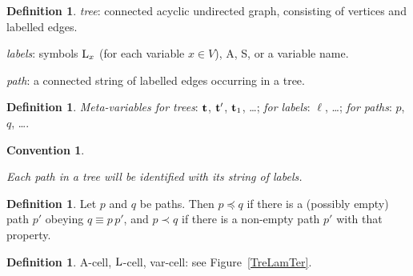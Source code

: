 \documentclass{article}
\theoremstyle{plain}
\newtheorem{Con}[The]{Convention}
\theoremstyle{definition}
\newtheorem{Def}[The]{Definition}
\begin{document}
\begin{Def}

{\em tree\/}: connected acyclic undirected graph, consisting of vertices and labelled edges.

{\em labels\/}: symbols ${\rm L}_x$ (for each variable $x \in V$), A, S, or a variable name.





{\em path\/}: a connected string of labelled edges occurring in a tree.
\end{Def}

\begin{Def}

{\em Meta-variables for trees\/}: ${\bf t}$, ${\bf t}'$, ${\bf t}_1$, \ldots;
{\em for labels\/}: $\ell$, \ldots;
{\em for paths\/}: $p$, $q$, \ldots.

\end{Def}

\begin{Con}\label{ConPat}


 Each {\em path\/} in a tree will be {\em identified\/} with its string of labels.
\end{Con}



\begin{Def} Let $p$ and $q$ be paths. Then $p \preceq q$ if there is a (possibly empty) path $p'$ obeying $q \equiv p \, p'$, and $p \prec q$ if there is a non-empty path $p'$ with that property.
\end{Def}

\begin{Def}

A-cell, ${\rm L}$-cell, var-cell: see Figure~\ref{TreLamTer}.


\end{Def}
\end{document}
